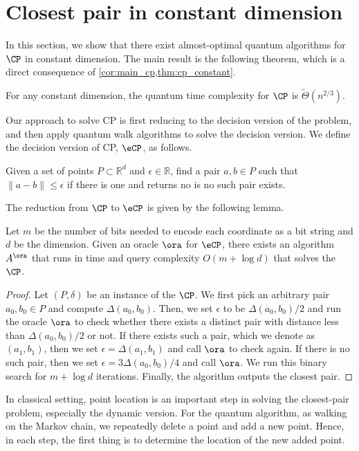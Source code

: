 \setcounter{section}{3}
\setcounter{theorem}{39}
\setcounter{figure}{2}
\section{Closest pair in constant dimension}
\label{sec:cp}

In this section, we show that there exist almost-optimal quantum algorithms for $\CP$ in constant dimension. The main result is the following theorem, which is a direct consequence of \cref{cor:main_cp,thm:cp_constant}.
\begin{theorem}
For any constant dimension, the quantum time complexity for $\CP$ is $\tilde{\Theta}(n^{2/3})$. 
\end{theorem}

Our approach to solve \textsf{CP} is first  reducing to the decision version of the problem, and then apply quantum walk algorithms to solve the decision version. We define the decision version of \textsf{CP},  $\eCP$, as follows. 
\begin{definition}[$\eCP$]
Given a set of points $P\subset \mathbb{R}^{d}$ and $\epsilon\in \mathbb{R}$, find a pair $a,b\in P$ such that $\|a-b\|\leq \epsilon$ if there is one and returns \textsf{no} is no such pair exists. 
\end{definition}
The reduction from $\CP$ to $\eCP$ is given by the following lemma.
\begin{lemma}
  \label{lemma:cp-ecp}
Let $m$ be the number of bits needed to encode each coordinate as a bit string and $d$ be the dimension.
Given an oracle $\ora$ for $\eCP$, there exists an algorithm $A^{\ora}$  that runs in time and query complexity $O(m+\log d )$ that solves the $\CP$. 
\end{lemma}
\begin{proof}
Let $(P,\delta)$ be an instance of the $\CP$.  We first pick an arbitrary pair $a_0,b_0\in P$ and compute $\Delta(a_0,b_0)$. Then, we set $\epsilon$ to be $\Delta(a_0,b_0)/2$ and run the oracle $\ora$ to check whether there exists a distinct pair with distance less than $\Delta(a_0,b_0)/2$ or not. If there exists such a pair, which we denote as $(a_1,b_1)$, then we set $\epsilon=\Delta(a_1,b_1)$ and call $\ora$ to check again. If there is no such pair, then we set $\epsilon=3\Delta(a_0,b_0)/4$ and call $\ora$. We run this binary search for $m+\log d$ iterations. Finally, the algorithm outputs the closest pair.  
\end{proof}

In classical setting, point location is an important step in solving the closest-pair problem, especially the dynamic version. For the quantum algorithm, as walking on the Markov chain, we repeatedly delete a point and add a new point. Hence, in each step, the first thing is to determine the location of the new added point.    

